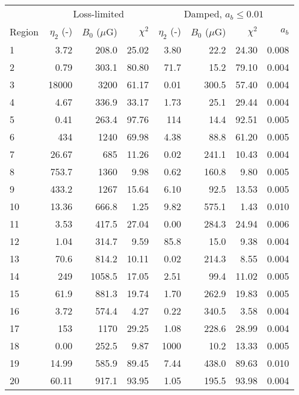 \begin{tabular}{@{} l rrr rrrr @{}}
\toprule
{} & \multicolumn{3}{c}{Loss-limited}
   & \multicolumn{4}{c}{Damped, $a_b \leq 0.01$} \\
\cmidrule(lr){2-4} \cmidrule(l){5-8}
Region & $\eta_2$ (-) & $B_0$ ($\mu$G) & $\chi^2$
       & $\eta_2$ (-) & $B_0$ ($\mu$G) & $\chi^2$ & $a_b$ \\
\midrule
 1 &  3.72 & 208.0 & 25.02 & 3.80 & 22.2 &  24.30 & 0.008 \\
 2 &  0.79 & 303.1 & 80.80 & 71.7 & 15.2 &  79.10 & 0.004 \\
 3 & 18000 & 3200  & 61.17 & 0.01 & 300.5 &  57.40 & 0.004 \\
\cmidrule{1-8}
 4 &  4.67 & 336.9 & 33.17 & 1.73 & 25.1 &  29.44 & 0.004 \\
 5 &  0.41 & 263.4 & 97.76 & 114 & 14.4 &   92.51 & 0.005 \\
 6 &   434 & 1240  & 69.98 & 4.38 & 88.8 &   61.20 & 0.005 \\
 7 & 26.67 & 685   & 11.26 & 0.02 & 241.1 &  10.43 & 0.004 \\
 8 & 753.7 & 1360  & 9.98  & 0.62 & 160.8 & 9.80 & 0.005 \\
 9 & 433.2 & 1267  & 15.64 & 6.10 & 92.5 &  13.53 & 0.005 \\
10 & 13.36 & 666.8 & 1.25  & 9.82 & 575.1 &  1.43 & 0.010 \\
\cmidrule{1-8}
11 & 3.53 & 417.5  & 27.04 & 0.00 & 284.3 &   24.94 & 0.006 \\
12 & 1.04 & 314.7  & 9.59  & 85.8 & 15.0 &    9.38 & 0.004 \\
13 & 70.6 & 814.2  & 10.11 & 0.02 & 214.3 &   8.55 & 0.004 \\
\cmidrule{1-8}
14 &  249 & 1058.5 & 17.05 & 2.51 & 99.4 &   11.02 & 0.005 \\
15 & 61.9 & 881.3  & 19.74 & 1.70 & 262.9 &   19.83 & 0.005 \\
16 & 3.72 & 574.4  & 4.27  & 0.22 & 340.5 &   3.58 & 0.004 \\
17 &  153 & 1170   & 29.25 & 1.08 & 228.6 &    28.99 & 0.004 \\
\cmidrule{1-8}
18 & 0.00 & 252.5  & 9.87  & 1000 & 10.2 &    13.33 & 0.005 \\
19 & 14.99 & 585.9 & 89.45 & 7.44 & 438.0 & 89.63 & 0.010 \\
20 & 60.11 & 917.1 & 93.95 & 1.05 & 195.5 & 93.98 & 0.004 \\
\bottomrule
\end{tabular}
